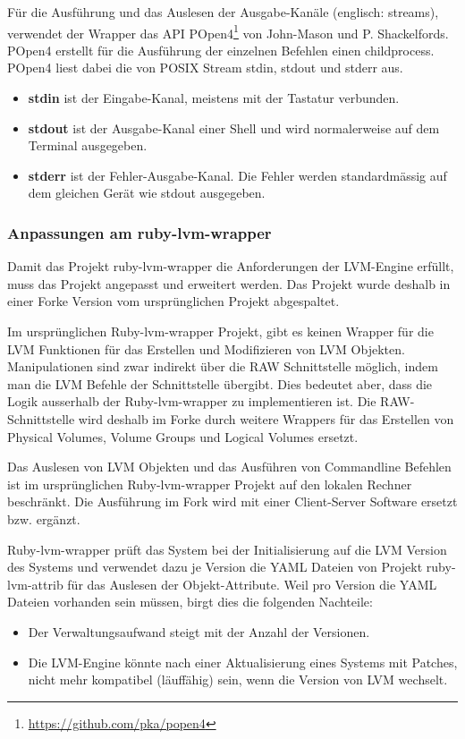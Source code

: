 Für die Ausführung und das Auslesen der Ausgabe-Kanäle (englisch: streams), verwendet der Wrapper das \gls{API}  \gls{POpen4}\footnote{\href{https://github.com/pka/popen4}{https://github.com/pka/popen4}} von John-Mason und P. Shackelfords. POpen4 erstellt für die Ausführung der einzelnen Befehlen einen childprocess. POpen4 liest dabei die von POSIX Stream stdin, stdout und stderr aus.
\nocite{TomZrner}

\begin{itemize}
\item \textbf{stdin} ist der Eingabe-Kanal, meistens mit der Tastatur verbunden.
\item \textbf{stdout} ist der Ausgabe-Kanal einer Shell und wird normalerweise auf dem Terminal ausgegeben.
\item \textbf{stderr} ist der Fehler-Ausgabe-Kanal. Die Fehler werden standardmässig auf dem gleichen Gerät wie stdout ausgegeben.
\end{itemize}




\subsubsection{Anpassungen am ruby-lvm-wrapper}

Damit das Projekt ruby-lvm-wrapper die Anforderungen der LVM-Engine erfüllt, muss das Projekt angepasst und erweitert werden. Das Projekt wurde deshalb in einer Forke Version vom ursprünglichen Projekt abgespaltet.

Im ursprünglichen Ruby-lvm-wrapper Projekt, gibt es keinen Wrapper für die LVM Funktionen für das Erstellen und Modifizieren von LVM Objekten. Manipulationen sind zwar indirekt über die RAW Schnittstelle möglich, indem man die LVM Befehle der Schnittstelle übergibt. Dies bedeutet aber, dass die Logik ausserhalb der Ruby-lvm-wrapper zu implementieren ist. Die RAW-Schnittstelle wird deshalb im Forke durch weitere Wrappers für das Erstellen von Physical Volumes, Volume Groups und Logical Volumes ersetzt.

Das Auslesen von LVM Objekten und das Ausführen von Commandline Befehlen ist im ursprünglichen Ruby-lvm-wrapper Projekt auf den lokalen Rechner beschränkt. Die Ausführung im Fork wird mit einer Client-Server Software ersetzt bzw. ergänzt.

Ruby-lvm-wrapper prüft das System bei der Initialisierung auf die LVM Version des Systems und verwendet dazu je Version die YAML Dateien von Projekt ruby-lvm-attrib für das Auslesen der Objekt-Attribute. Weil pro Version die YAML Dateien vorhanden sein müssen,  birgt dies die folgenden Nachteile:
\begin{itemize}
\item Der Verwaltungsaufwand steigt mit der Anzahl der Versionen.
\item Die LVM-Engine könnte nach einer Aktualisierung eines Systems mit Patches, nicht mehr kompatibel (läuffähig) sein, wenn die Version von LVM wechselt.
\end{itemize}

